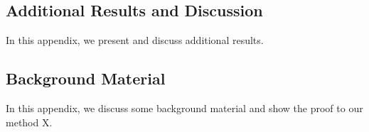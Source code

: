 \begin{singlespace}
    \chapter{Additional Results and Discussion}
\end{singlespace}

In this appendix, we present and discuss additional results.

\begin{singlespace}
    \chapter{Background Material}
\end{singlespace}

In this appendix, we discuss some background material and show the proof to our method X.
